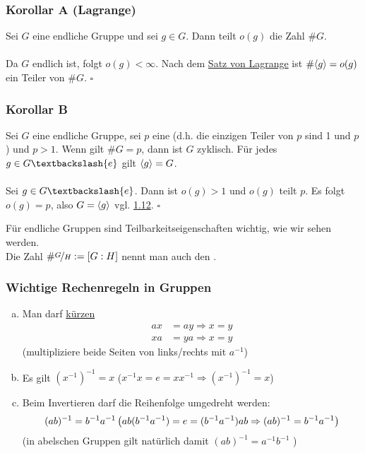 \subsubsection*{Korollar A (Lagrange)}
Sei $G$ eine endliche Gruppe und sei $g\in G$. Dann teilt $o(g)$ die Zahl $\#G$.\\

\\
Da $G$ endlich ist, folgt $o(g)<\infty$. Nach dem \hyperref[sub:satz_von_lagrange]{Satz von Lagrange} ist $\#\langle g \rangle=o(g)$ ein Teiler von $\#G$.
\hfill $\square$

\subsubsection*{Korollar B}
Sei $G$ eine endliche Gruppe, sei $p$ eine   (d.h. die einzigen Teiler von $p$ sind 1 und $p$) und $p>1$. Wenn gilt $\#G=p$, dann ist $G$ zyklisch. Für jedes $g\in G \textbackslash\{e\}$ gilt $\langle g \rangle=G$.\\

\\
Sei $g \in G\textbackslash\{e\}$. Dann ist $o(g)>1$ und $o(g)$ teilt $p$. Es folgt $o(g)=p$, also $G=\langle g \rangle$ vgl. \hyperref[sub:zyklische_gruppen]{1.12}.
\hfill $\square$

Für endliche Gruppen sind Teilbarkeitseigenschaften wichtig, wie wir sehen werden.\\
Die Zahl $\#\nicefrac{G}{H}:=[G:H]$ nennt man auch den .

\subsubsection*{Wichtige Rechenregeln in Gruppen}
\begin{enumerate}[(a)]
	\item Man darf \uline{kürzen}
	\begin{equation*}
	\begin{aligned}
		ax &= ay \Rightarrow x=y\\
		xa &= ya \Rightarrow x=y
	\end{aligned}
	\end{equation*}
	(multipliziere beide Seiten von links/rechts mit $a^{-1}$)
	\item Es gilt $(x^{-1})^{-1}=x$   ($x^{-1}x=e=xx^{-1} \Rightarrow (x^{-1})^{-1}=x$)
	\item Beim Invertieren darf die Reihenfolge umgedreht werden:\\
	\[(ab)^{-1}=b^{-1}a^{-1}\\
	\left( ab(b^{-1}a^{-1})=e=(b^{-1}a^{-1})ab \Rightarrow (ab)^{-1}=b^{-1}a^{-1}\right)
	\]
	(in abelschen Gruppen gilt natürlich damit $(ab)^{-1}=a^{-1}b^{-1}$ )
\end{enumerate}
